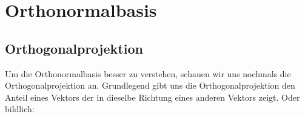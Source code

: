 \setcounter{section}{3}
\section{Orthonormalbasis}

\subsection{Orthogonalprojektion}

Um die Orthonormalbasis besser zu verstehen, schauen wir uns nochmals die Orthogonalprojektion an. Grundlegend gibt uns die Orthogonalprojektion den Anteil eines Vektors der in dieselbe Richtung eines anderen Vektors zeigt. Oder bildlich:

\begin{figure*}[h!]
    \centering
    \begin{tikzpicture}[x=0.75pt,y=0.75pt,yscale=-1,xscale=1]


\end{tikzpicture}
\end{figure*}
